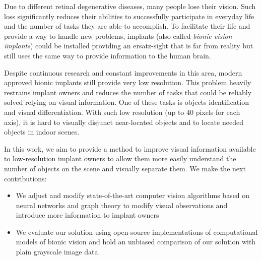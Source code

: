 
Due to different retinal degenerative diseases, many people 
lose their vision. Such loss significantly reduces their abilities to 
successfully participate in everyday life and the number of tasks they
are able to accomplish. To facilitate their life and provide a way to 
handle new problems, implants (also called \textit{bionic vision implants}) 
could be installed providing an ersatz-sight that is far from reality but still
uses the same way to provide information to the human brain.  

Despite continuous research and constant improvements in this area, 
modern approved bionic implants still provide very low resolution. 
This problem heavily restrains implant owners and reduces the number 
of tasks that could be reliably solved relying on visual information. 
One of these tasks is objects identification and visual differentiation. 
With such low resolution (up to 40 pixels for each axis), it is hard to 
visually disjunct near-located objects and to locate needed objects in indoor scenes.

In this work, we aim to provide a method to improve visual information available 
to low-resolution implant owners to allow them more easily understand the number of 
objects on the scene and visually separate them. We make the next contributions:
\begin{itemize}
    \item We adjust and modify state-of-the-art computer vision algorithms based on neural networks 
    and graph theory to modify visual observations and introduce more information to implant owners
    \item We evaluate our solution using open-source implementations of computational models of bionic 
    vision and hold an unbiased comparison of our solution with plain grayscale image data.   
\end{itemize}